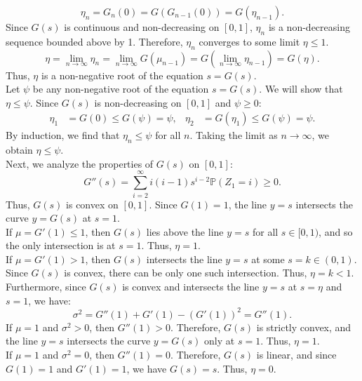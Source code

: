 \documentclass{huhtakm-template-book-v2}
\newcommand{\prob}{\mathbb{P}}
\begin{document}
    \begin{proofing}
        \begin{equation*}
            \eta_{n} = G_{n}(0) = G(G_{n-1}(0)) = G(\eta_{n-1}).
        \end{equation*}
        Since $G(s)$ is continuous and non-decreasing on $[0,1]$, $\eta_{n}$ is a non-decreasing sequence bounded above by 1. Therefore, $\eta_{n}$ converges to some limit $\eta \leq 1$.
        \begin{equation*}
            \eta = \lim_{n \to \infty}\eta_{n} = \lim_{n \to \infty}G(\mu_{n-1}) = G\left(\lim_{n \to \infty}\eta_{n-1}\right) = G(\eta).
        \end{equation*}
        Thus, $\eta$ is a non-negative root of the equation $s = G(s)$.\\
        Let $\psi$ be any non-negative root of the equation $s = G(s)$. We will show that $\eta \leq \psi$. Since $G(s)$ is non-decreasing on $[0,1]$ and $\psi \geq 0$:
        \begin{align*}
            \eta_{1} &= G(0) \leq G(\psi) = \psi, & \eta_{2} &= G(\eta_{1}) \leq G(\psi) = \psi.
        \end{align*}
        By induction, we find that $\eta_{n} \leq \psi$ for all $n$. Taking the limit as $n \to \infty$, we obtain $\eta \leq \psi$.\\
        Next, we analyze the properties of $G(s)$ on $[0,1]$:
        \begin{equation*}
            G''(s) = \sum_{i = 2}^{\infty}i(i-1)s^{i-2}\prob(Z_{1} = i) \geq 0.
        \end{equation*}
        Thus, $G(s)$ is convex on $[0,1]$. Since $G(1) = 1$, the line $y = s$ intersects the curve $y = G(s)$ at $s = 1$.\\
        If $\mu = G'(1) \leq 1$, then $G(s)$ lies above the line $y = s$ for all $s \in [0,1)$, and so the only intersection is at $s = 1$. Thus, $\eta = 1$.\\
        If $\mu = G'(1) > 1$, then $G(s)$ intersects the line $y = s$ at some $s = k \in (0,1)$. Since $G(s)$ is convex, there can be only one such intersection. Thus, $\eta = k < 1$.\\
        Furthermore, since $G(s)$ is convex and intersects the line $y = s$ at $s = \eta$ and $s = 1$, we have:
        \begin{equation*}
            \sigma^{2} = G''(1)+G'(1)-(G'(1))^{2} = G''(1).
        \end{equation*}
        If $\mu = 1$ and $\sigma^{2} > 0$, then $G''(1) > 0$. Therefore, $G(s)$ is strictly convex, and the line $y = s$ intersects the curve $y = G(s)$ only at $s = 1$. Thus, $\eta = 1$.\\
        If $\mu = 1$ and $\sigma^{2} = 0$, then $G''(1) = 0$. Therefore, $G(s)$ is linear, and since $G(1) = 1$ and $G'(1) = 1$, we have $G(s) = s$. Thus, $\eta = 0$.
    \end{proofing}
    \newpage
\end{document}
